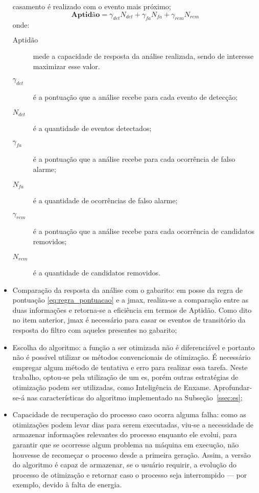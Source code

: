 \begin{itemize}
casamento é realizado com o evento mais próximo;
\begin{equation}\label{eq:regra_pontuacao}
\textbf{Aptidão}=\gamma_{det}N_{det}+\gamma_{fa}N_{fa}+\gamma_{rem}N_{rem}
\end{equation}
\noindent onde:
\begin{description}
\item[$\text{Aptidão}$] mede a capacidade de resposta da análise realizada,
sendo de interesse maximizar esse valor.
\item[$\gamma_{det}$] é a pontuação que a análise recebe para cada
evento de detecção;
\item[$N_{det}$] é a quantidade de eventos detectados;
\item[$\gamma_{fa}$] é a pontuação que a análise recebe para cada
ocorrência de falso alarme;
\item[$N_{fa}$] é a quantidade de ocorrências de falso alarme;
\item[$\gamma_{rem}$] é a pontuação que a análise recebe para cada
ocorrência de candidatos removidos;
\item[$N_{rem}$] é a quantidade de candidatos removidos.
\end{description}

\item Comparação da resposta da análise com o gabarito: em posse da
regra de pontuação \ref{eq:regra_pontuacao} e a \gls{jmax}, realiza-se a
comparação entre as duas informações e retorna-se a eficiência em termos
de Aptidão. Como dito no item anterior, \gls{jmax} é necessário para
casar os eventos de transitório da resposta do filtro com aqueles
presentes no gabarito;

\item Escolha do algoritmo: a função a ser otimizada não é
diferenciável e portanto não é possível utilizar os métodos
convencionais de otimização. É necessário empregar algum método de
tentativa e erro para realizar essa tarefa. Neste trabalho, optou-se
pela utilização de um \acs{es}, porém outras estratégias de
otimização podem ser utilizadas, como Inteligência de Enxame. 
Aprofundar-se-á nas características do algoritmo
implementado na Subseção~\ref{ssec:es};

\item Capacidade de recuperação do processo caso ocorra alguma falha: 
como as otimizações podem levar dias para serem executadas, viu-se a
necessidade de armazenar informações relevantes do processo enquanto
ele evolui, para garantir que se ocorresse algum problema na máquina
em execução, não houvesse de recomeçar o processo desde a primeira
geração. Assim, a versão do algoritmo é capaz de armazenar, se o
usuário requirir, a evolução do processo de otimização e retornar caso
o processo seja interrompido --- por exemplo, devido à falta de
energia. 

\end{itemize}


